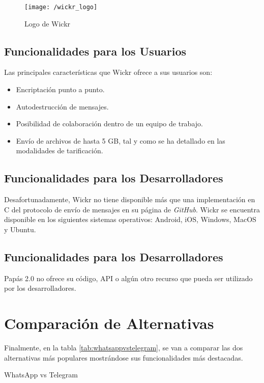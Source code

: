 \begin{figure}[!h]
	\begin{center}
		\texttt{[image: /wickr\_logo]}
		\caption{Logo de Wickr}
		\label{fig:wickr}
	\end{center}
\end{figure}

\subsection{Funcionalidades para los Usuarios}
Las principales características que Wickr ofrece a sus usuarios son:

\begin{itemize}
	\item Encriptación punto a punto.
	\item Autodestrucción de mensajes.
	\item Posibilidad de colaboración dentro de un equipo de trabajo.
	\item Envío de archivos de hasta 5 \acs{GB}, tal y como se ha detallado en las modalidades de tarificación.
\end{itemize}

\subsection{Funcionalidades para los Desarrolladores}
Desafortunadamente, Wickr no tiene disponible más que una implementación en C del protocolo de envío de mensajes en su página de \textit{GitHub}. Wickr se encuentra disponible en los siguientes sistemas operativos: Android, iOS, Windows, MacOS y Ubuntu.

\newpage

\subsection{Funcionalidades para los Desarrolladores}
Papás 2.0 no ofrece su código, \acs{API} o algún otro recurso que pueda ser utilizado por los desarrolladores.

\section{Comparación de Alternativas}
Finalmente, en la tabla \ref{tab:whatsappvstelegram}, se van a comparar las dos alternativas más populares mostrándose sus funcionalidades más destacadas.

\begin{table}[hp]
	\centering
	{\small
		
	}
	\caption[WhatsApp vs Telegram]
	{WhatsApp vs Telegram}
	\label{tab:whatsappvstelegram}
\end{table}

